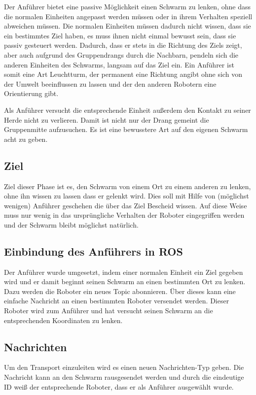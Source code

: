 Der Anführer bietet eine passive Möglichkeit einen Schwarm zu lenken, ohne dass die normalen Einheiten angepasst werden müssen oder in ihrem Verhalten speziell abweichen müssen. Die normalen Einheiten müssen dadurch nicht wissen, dass sie ein bestimmtes Ziel haben, es muss ihnen nicht einmal bewusst sein, dass sie passiv gesteuert werden. Dadurch, dass er stets in die Richtung des Ziels zeigt, aber auch aufgrund des Gruppendrangs durch die Nachbarn, pendeln sich die anderen Einheiten des Schwarms, langsam auf das Ziel ein. Ein Anführer ist somit eine Art Leuchtturm, der permanent eine Richtung angibt ohne sich von der Umwelt beeinflussen zu lassen und der den anderen Robotern eine Orientierung gibt.

Als Anführer versucht die entsprechende Einheit außerdem den Kontakt zu seiner Herde nicht zu verlieren. Damit ist nicht nur der Drang gemeint die Gruppenmitte aufzusuchen. Es ist eine bewusstere Art auf den eigenen Schwarm acht zu geben.

\subsection*{Ziel}

Ziel dieser Phase ist es, den Schwarm von einem Ort zu einem anderen zu lenken, ohne ihn wissen zu lassen dass er gelenkt wird. Dies soll mit Hilfe von (möglichst wenigen) Anführer geschehen die über das Ziel Bescheid wissen. Auf diese Weise muss nur wenig  in das ursprüngliche Verhalten der Roboter eingegriffen werden und der Schwarm bleibt möglichst natürlich.

\subsection*{Einbindung des Anführers in ROS}

Der Anführer wurde umgesetzt, indem einer normalen Einheit ein Ziel gegeben wird und er damit beginnt seinen Schwarm an einen bestimmten Ort zu lenken. Dazu werden die Roboter ein neues Topic abonnieren. Über dieses kann eine einfache Nachricht an einen bestimmten Roboter versendet werden. Dieser Roboter wird zum Anführer und hat versucht seinen Schwarm an die entsprechenden Koordinaten zu lenken.

\subsection*{Nachrichten}

Um den Transport einzuleiten wird es einen neuen Nachrichten-Typ geben. Die Nachricht kann an den Schwarm rausgesendet werden und durch die eindeutige ID weiß der entsprechende Roboter, dass er als Anführer ausgewählt wurde.

